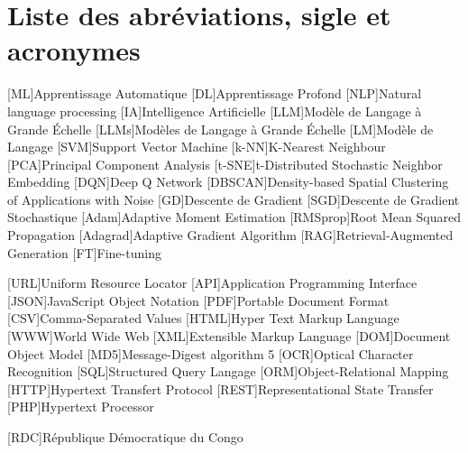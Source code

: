 

\chapter*{Liste des abréviations, sigle et acronymes}

\begin{acronym}[LLM]

[ML]{Apprentissage Automatique}
[DL]{Apprentissage Profond}
[NLP]{Natural language processing}
[IA]{Intelligence Artificielle}
[LLM]{Modèle de Langage à Grande Échelle}
[LLMs]{Modèles de Langage à Grande Échelle}
[LM]{Modèle de Langage}
[SVM]{Support Vector Machine}
[k-NN]{K-Nearest Neighbour}
[PCA]{Principal Component Analysis}
[t-SNE]{t-Distributed Stochastic Neighbor Embedding}
[DQN]{Deep Q Network}
[DBSCAN]{Density-based Spatial Clustering of Applications with Noise}
[GD]{Descente de Gradient}
[SGD]{Descente de Gradient Stochastique}
[Adam]{Adaptive Moment Estimation}
[RMSprop]{Root Mean Squared Propagation}
[Adagrad]{Adaptive Gradient Algorithm}
[RAG]{Retrieval-Augmented Generation}
[FT]{Fine-tuning}

[URL]{Uniform Resource Locator}
[API]{Application Programming Interface}
[JSON]{JavaScript Object Notation}
[PDF]{Portable Document Format}
[CSV]{Comma-Separated Values}
[HTML]{Hyper Text Markup Language}
[WWW]{World Wide Web}
[XML]{Extensible Markup Language}
[DOM]{Document Object Model}
[MD5]{Message-Digest algorithm 5}
[OCR]{Optical Character Recognition}
[SQL]{Structured Query Langage}
[ORM]{Object-Relational Mapping}
[HTTP]{Hypertext Transfert Protocol}
[REST]{Representational State Transfer}
[PHP]{Hypertext Processor}

[RDC]{République Démocratique du Congo}
\end{acronym}  
                   
\endgroup
